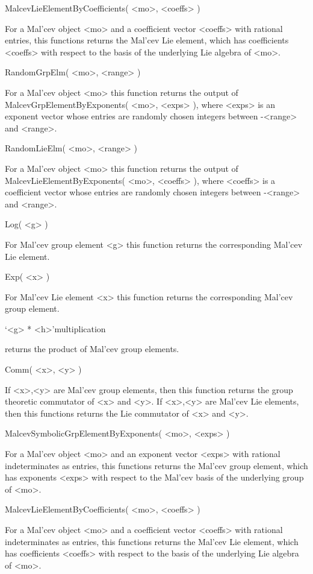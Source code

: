 \> MalcevLieElementByCoefficients( <mo>, <coeffs> )

For a Mal'cev object <mo> and a coefficient vector <coeffs> with rational 
entries, this functions returns the Mal'cev Lie element, which 
has coefficients  <coeffs> with respect to the basis of the underlying
Lie algebra of <mo>.

\> RandomGrpElm( <mo>, <range> )

For a Mal'cev object <mo> this function returns the output of 
MalcevGrpElementByExponents( <mo>, <exps> ), where <exps> is an
exponent vector whose entries are randomly chosen integers between 
-<range> and <range>.

\> RandomLieElm( <mo>, <range> )

For a Mal'cev object <mo> this function returns the output of 
MalcevLieElementByExponents( <mo>, <coeffs> ), where <coeffs> is 
a coefficient vector whose entries are randomly chosen integers between 
-<range> and <range>.

\> Log( <g> )

For Mal'cev group element <g> this function returns the corresponding
Mal'cev Lie element.

\> Exp( <x> )

For Mal'cev Lie element <x> this function returns the corresponding
Mal'cev group element.

\> `<g> * <h>'{multiplication} 

returns the product of Mal'cev group elements.

\> Comm( <x>, <y> )

If <x>,<y> are Mal'cev group elements, then this function returns
the group theoretic commutator of <x> and <y>.
If <x>,<y> are Mal'cev Lie elements, then this functions returns
the Lie commutator of <x> and <y>.

\> MalcevSymbolicGrpElementByExponents( <mo>, <exps> )

For a Mal'cev object <mo> and an exponent vector <exps> with rational 
indeterminates as entries, 
this functions returns the Mal'cev group element, which 
has exponents <exps> with respect to the Mal'cev basis of the underlying
group of <mo>.

\> MalcevLieElementByCoefficients( <mo>, <coeffs> )

For a Mal'cev object <mo> and a coefficient vector <coeffs> with rational 
indeterminates as entries, 
this functions returns the Mal'cev Lie element, which 
has coefficients  <coeffs> with respect to the basis of the underlying
Lie algebra of <mo>.

